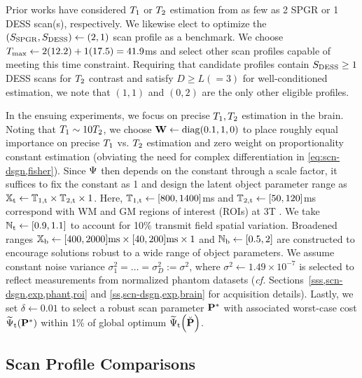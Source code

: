 Prior works have considered $T_1$ or $T_2$ estimation 
from as few as 2 SPGR 
\cite{wang:87:otp, deoni:03:rct} 
or 1 DESS \cite{welsch:09:reo} scan(s), 
respectively. 
We likewise elect to optimize 
the $(S_{\mathrm{SPGR}}, S_{\mathrm{DESS}}) \gets (2,1)$ scan profile 
as a benchmark. 
We choose $T_\mathrm{max} \gets 2(12.2) + 1(17.5) = 41.9$ms 
and select other scan profiles capable 
of meeting this time constraint. 
Requiring that candidate profiles contain $S_{\mathrm{DESS}} \ge 1$ DESS scans 
for $T_2$ contrast and satisfy $D \ge L (=3)$ 
for well-conditioned estimation, 
we note that $(1,1)$ and $(0,2)$ 
are the only other eligible profiles. 

In the ensuing experiments, 
we focus on precise $T_1,T_2$ estimation in the brain.
Noting that $T_1\sim10T_2$, 
we choose $\mathbf{W} \gets \mathrm{diag}\paren{0.1, 1, 0}$ 
to place roughly equal importance 
on precise $T_1$ vs. $T_2$ estimation
and zero weight
on proportionality constant estimation
(obviating the need
for complex differentiation
in \eqref{eq:scn-dsgn,fisher}).
Since $\Psi$ then depends 
on the constant through a scale factor,
it suffices to fix the constant as 1
and design the latent object parameter range
as $\mathbb{X}_\mathrm{t} \gets \mathbb{T}_{1,\mathrm{t}} \times \mathbb{T}_{2,\mathrm{t}} \times 1$.
Here, 
$\mathbb{T}_{1,\mathrm{t}} \gets [800, 1400]$ms
and $\mathbb{T}_{2,\mathrm{t}} \gets [50, 120]$ms
correspond with WM and GM regions of interest (ROIs)
at 3T \cite{wansapura:99:nrt, stanisz:05:ttr}.
We take $\setNt \gets \brac{0.9, 1.1}$ 
to account for 10\% transmit field spatial variation. 
Broadened ranges 
$\mathbb{X}_\mathrm{b} \gets [400, 2000]\text{ms} \times [40, 200]\text{ms} \times 1$ 
and $\mathbb{N}_\mathrm{b} \gets [0.5, 2]$ are constructed 
to encourage solutions robust 
to a wide range of object parameters. 
We assume constant noise variance 
$\sigma_1^2 = \dots = \sigma_D^2 := \sigma^2$, 
where $\sigma^2 \gets 1.49 \times 10^{-7}$ is selected 
to reflect measurements from normalized phantom datasets 
(\emph{cf.} Sections~\ref{sss,scn-dsgn,exp,phant,roi} 
and \ref{ss,scn-dsgn,exp,brain} 
for acquisition details).
Lastly, we set $\delta \gets 0.01$ 
to select a robust scan parameter $\mathbf{P}^*$ 
with associated worst-case cost $\costawt{\bmPs}$ 
within 1\% of global optimum $\costawt{\bmPc}$.

\subsection{Scan Profile Comparisons}
\label{ssec:opt:compare}

